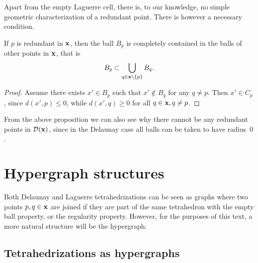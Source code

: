 Apart from the empty Laguerre cell, there is, to our knowledge, no simple geometric characterization of a redundant point. There is however a necessary condition.

\begin{proposition}
	If $p$ is redundant in ${\mathbf{x}}$, then the ball $B_p$ is completely contained in the balls of other points in ${\mathbf{x}}$, that is 
	$$B_p \subset \bigcup_{q \in {\mathbf{x}}\setminus \{p\}} B_q.$$
\end{proposition}
\begin{proof}
	Assume there exists $x' \in B_p$ such that $x' \notin B_q$ for any $q\neq p$. Then $x' \in C_p$, since $d(x', p) \leq 0$, while $d(x',q) \geq 0$ for all $q\in {\mathbf{x}}, q\neq p$.
\end{proof}



From the above proposition we can also see why there cannot be any redundant points in $\mathcal D({\mathbf{x}})$, since in the Delaunay case all balls can be taken to have radius~$0$.


\section{Hypergraph structures}\label{sec:hypergraphs}
Both Delaunay and Laguerre tetrahedrizations can be seen as graphs where two points $p,q\in{\mathbf{x}}$ are joined if they are part of the same tetrahedron with the empty ball property, or the regularity property. However, for the purposes of this text, a more natural structure will be the hypergraph.

\subsection{Tetrahedrizations as hypergraphs}\label{sec:tetrahyper}
 
